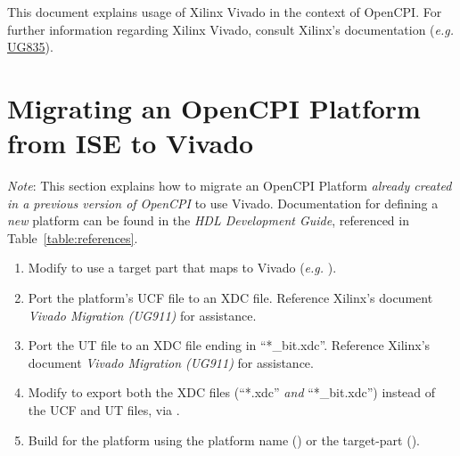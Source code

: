 \begin{flushleft}
This document explains usage of Xilinx Vivado in the context of OpenCPI. For further information regarding Xilinx Vivado, consult Xilinx's documentation (\textit{e.g.} \href{https://www.xilinx.com/support/documentation/sw_manuals/xilinx2017_1/ug835-vivado-tcl-commands.pdf}{UG835}).
\section{Migrating an OpenCPI Platform from ISE to Vivado}
\textit{Note}: This section explains how to migrate an OpenCPI Platform \textit{already created in a previous version of OpenCPI} to use Vivado. Documentation for defining a \textit{new} platform can be found in the \textit{HDL Development Guide}, referenced in Table~\ref{table:references}.
\begin{enumerate}
\item Modify  to use a target part that maps to Vivado (\textit{e.g.} ).
\item Port the platform's UCF file to an XDC file. Reference Xilinx's document \textit{Vivado Migration (UG911)} for assistance.
\item Port the UT file to an XDC file ending in ``*\_bit.xdc''. Reference Xilinx's document \textit{Vivado Migration (UG911)} for assistance.
\item Modify  to export both the XDC files (``*.xdc'' \textit{and} ``*\_bit.xdc'') instead of the UCF and UT files, via .
\item Build for the platform using the platform name () or the target-part ().
\end{enumerate}


\end{flushleft}
